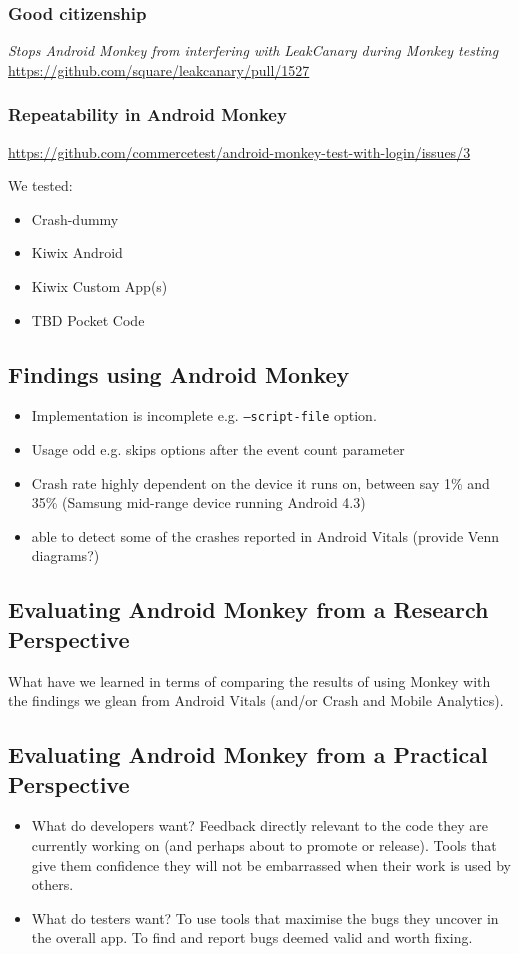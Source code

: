 \subsubsection{Good citizenship}

\emph{Stops Android Monkey from interfering with LeakCanary during Monkey testing} \url{https://github.com/square/leakcanary/pull/1527}

\subsubsection{Repeatability in Android Monkey}

\url{https://github.com/commercetest/android-monkey-test-with-login/issues/3}

We tested:
\begin{itemize}
    \item Crash-dummy
    \item Kiwix Android
    \item Kiwix Custom App(s)
    \item TBD Pocket Code
\end{itemize}

\subsection{Findings using Android Monkey}
\begin{itemize}
    \item Implementation is incomplete e.g. \texttt{--script-file} option.
    \item Usage odd e.g. skips options after the event count parameter
    \item Crash rate highly dependent on the device it runs on, between say 1\% and 35\% (Samsung mid-range device running Android 4.3)
    \item able to detect some of the crashes reported in Android Vitals (provide Venn diagrams?)
\end{itemize}

\subsection{Evaluating Android Monkey from a Research Perspective}
What have we learned in terms of comparing the results of using Monkey with the findings we glean from Android Vitals (and/or Crash and Mobile Analytics).
\subsection{Evaluating Android Monkey from a Practical Perspective}
\begin{itemize}
    \item What do developers want? Feedback directly relevant to the code they are currently working on (and perhaps about to promote or release). Tools that give them confidence they will not be embarrassed when their work is used by others.
    \item What do testers want? To use tools that maximise the bugs they uncover in the overall app. To find and report bugs deemed valid and worth fixing.
\end{itemize}

